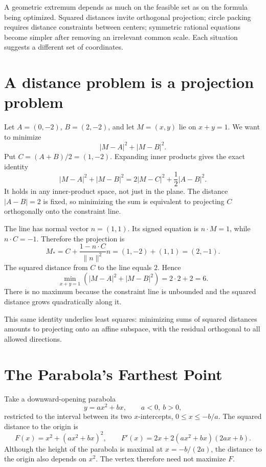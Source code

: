 
A geometric extremum depends as much on the feasible set as on the formula being optimized. Squared distances invite orthogonal projection; circle packing requires distance constraints between centers; symmetric rational equations become simpler after removing an irrelevant common scale. Each situation suggests a different set of coordinates.

\section{A distance problem is a projection problem}

Let \(A=(0,-2)\), \(B=(2,-2)\), and let \(M=(x,y)\) lie on \(x+y=1\). We want to minimize
\[
 |M-A|^2+|M-B|^2.
\]
Put \(C=(A+B)/2=(1,-2)\). Expanding inner products gives the exact identity
\[
 \boxed{|M-A|^2+|M-B|^2
       =2|M-C|^2+\frac12|A-B|^2.}
\]
It holds in any inner-product space, not just in the plane. The distance \(|A-B|=2\) is fixed, so minimizing the sum is equivalent to projecting \(C\) orthogonally onto the constraint line.

The line has normal vector \(n=(1,1)\). Its signed equation is \(n\cdot M=1\), while \(n\cdot C=-1\). Therefore the projection is
\[
 M_*=C+\frac{1-n\cdot C}{\|n\|^2}n
 =(1,-2)+(1,1)=(2,-1).
\]
The squared distance from \(C\) to the line equals \(2\). Hence
\[
 \min_{x+y=1}(|M-A|^2+|M-B|^2)=2\cdot2+2=6.
\]
There is no maximum because the constraint line is unbounded and the squared distance grows quadratically along it.

This same identity underlies least squares: minimizing sums of squared distances amounts to projecting onto an affine subspace, with the residual orthogonal to all allowed directions.

\section{The Parabola's Farthest Point}

Take a downward-opening parabola
\[
 y=ax^2+bx,\qquad a<0,\ b>0,
\]
restricted to the interval between its two \(x\)-intercepts, \(0\le x\le-b/a\). The squared distance to the origin is
\[
 F(x)=x^2+(ax^2+bx)^2,
 \qquad F'(x)=2x+2(ax^2+bx)(2ax+b).
\]
Although the height of the parabola is maximal at \(x=-b/(2a)\), the distance to the origin also depends on \(x^2\). The vertex therefore need not maximize \(F\).

